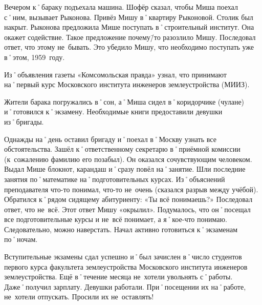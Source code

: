 Вечером к˚бараку подъехала машина. Шофёр сказал, чтобы Миша поехал с˚ним, вызывает Рыконова. Привёз Мишу в˚квартиру Рыконовой. Столик был накрыт. Рыконова предложила Мише поступать в˚строительный институт. Она окажет содействие. Такое предложение почему\=/то разозлило Мишу. Последовал ответ, что этому не~бывать. Это убедило Мишу, что необходимо поступать уже в˚этом, 1959~году.

Из˚объявления газеты «Комсомольская правда» узнал, что принимают на˚первый курс Московского института инженеров землеустройства (МИИЗ).

Жители барака погружались в˚сон, а˚Миша сидел в˚коридорчике (чулане)  и˚готовился к˚экзамену. Необходимые книги предоставили девушки из˚бригады.

Однажды на˚день оставил бригаду и˚поехал в˚Москву узнать все обстоятельства. Зашёл к˚ответственному секретарю в˚приёмной комиссии (к~сожалению фамилию его позабыл). Он оказался сочувствующим человеком. Выдал Мише блокнот, карандаш и˚сразу повёл на˚занятие. Шли последние занятия по˚математике на˚подготовительных курсах. Из˚объяснений преподавателя что-то понимал, что-то не~очень (сказался разрыв между учёбой). Обратился к˚рядом сидящему абитуриенту: «Ты всё понимаешь?» Последовал ответ, что не~всё. Этот ответ Мишу «окрылил». Подумалось, что он˚посещал все подготовительные курсы и не~всё понимает, а я˚кое-что понимаю. Следовательно, можно наверстать. Начал активно готовиться к˚экзаменам по˚ночам.

Вступительные экзамены сдал успешно и˚был зачислен в˚число студентов первого курса факультета землеустройства Московского института инженеров землеустройства. Ещё в˚течение месяца не~хотели увольнять с˚работы. Даже˚получил зарплату. Девушки работали. При˚посещении их на˚работе, не~хотели отпускать. Просили их не~оставлять!